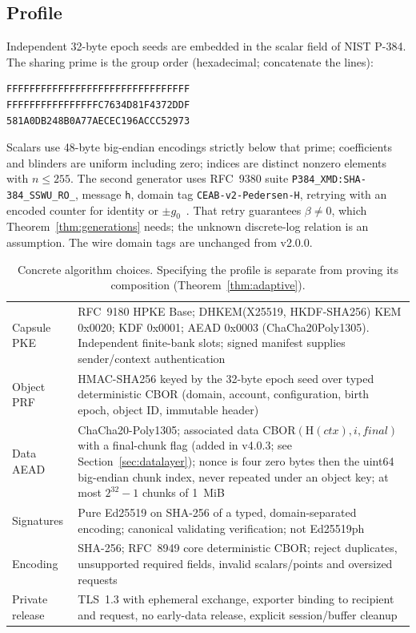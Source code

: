 \documentclass[pdflatex,sn-mathphys-num]{sn-jnl}
\theoremstyle{plain}
\theoremstyle{definition}
\newcommand{\code}[1]{\texttt{#1}}
\begin{document}
\subsection{Profile}\label{sec:profile}
Independent 32-byte epoch seeds are embedded in the scalar field of NIST P-384. The sharing prime is the group order (hexadecimal; concatenate the lines):
\begin{Verbatim}[fontsize=\small]
FFFFFFFFFFFFFFFFFFFFFFFFFFFFFFFF
FFFFFFFFFFFFFFFFC7634D81F4372DDF
581A0DB248B0A77AECEC196ACCC52973
\end{Verbatim}
Scalars use 48-byte big-endian encodings strictly below that prime; coefficients and blinders are uniform including zero; indices are distinct nonzero elements with $n\le255$. The second generator uses RFC~9380 suite \code{P384\_XMD:SHA-384\_SSWU\_RO\_}, message \code{h}, domain tag \code{CEAB-v2-Pedersen-H}, retrying with an encoded counter for identity or $\pm g_0$~\cite{rfc9380,sec2}. That retry guarantees $\beta\ne0$, which Theorem~\ref{thm:generations} needs; the unknown discrete-log relation is an assumption. The wire domain tags are unchanged from v2.0.0.

\begin{table}[htbp]
\caption{Concrete algorithm choices. Specifying the profile is separate from proving its composition (Theorem~\ref{thm:adaptive}).}\label{tab:profile}
\centering\footnotesize
\altrows
\begin{tabularx}{\linewidth}{@{}p{.24\linewidth}Y@{}}\toprule
{} & \\\midrule
Capsule PKE & RFC~9180 HPKE Base; DHKEM(X25519, HKDF-SHA256) KEM 0x0020; KDF 0x0001; AEAD 0x0003 (ChaCha20Poly1305). Independent finite-bank slots; signed manifest supplies sender/context authentication~\cite{rfc9180}\\
Object PRF & HMAC-SHA256 keyed by the 32-byte epoch seed over typed deterministic CBOR (domain, account, configuration, birth epoch, object ID, immutable header)\\
Data AEAD & ChaCha20-Poly1305; associated data CBOR$(\mathrm{H}(\mathit{ctx}),i,\mathit{final})$ with a final-chunk flag (added in v4.0.3; see Section~\ref{sec:datalayer}); nonce is four zero bytes then the uint64 big-endian chunk index, never repeated under an object key; at most $2^{32}-1$ chunks of 1~MiB~\cite{rfc8439}\\
Signatures & Pure Ed25519 on SHA-256 of a typed, domain-separated encoding; canonical validating verification; not Ed25519ph~\cite{rfc8032}\\
Encoding & SHA-256; RFC~8949 core deterministic CBOR; reject duplicates, unsupported required fields, invalid scalars/points and oversized requests~\cite{rfc8949}\\
Private release & TLS~1.3 with ephemeral exchange, exporter binding to recipient and request, no early-data release, explicit session/buffer cleanup~\cite{rfc8446}\\\bottomrule
\end{tabularx}
\end{table}
\end{document}
